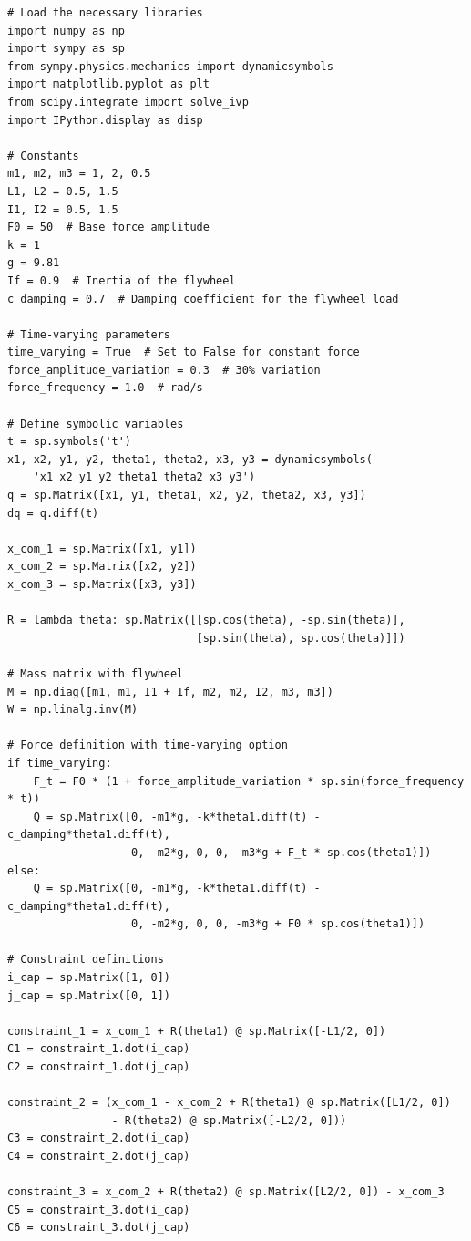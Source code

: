 \documentclass[10pt]{article}
\begin{document}
\begin{verbatim}
# Load the necessary libraries
import numpy as np
import sympy as sp
from sympy.physics.mechanics import dynamicsymbols
import matplotlib.pyplot as plt
from scipy.integrate import solve_ivp
import IPython.display as disp

# Constants
m1, m2, m3 = 1, 2, 0.5
L1, L2 = 0.5, 1.5
I1, I2 = 0.5, 1.5
F0 = 50  # Base force amplitude
k = 1
g = 9.81
If = 0.9  # Inertia of the flywheel
c_damping = 0.7  # Damping coefficient for the flywheel load

# Time-varying parameters
time_varying = True  # Set to False for constant force
force_amplitude_variation = 0.3  # 30% variation
force_frequency = 1.0  # rad/s

# Define symbolic variables
t = sp.symbols('t')
x1, x2, y1, y2, theta1, theta2, x3, y3 = dynamicsymbols(
    'x1 x2 y1 y2 theta1 theta2 x3 y3')
q = sp.Matrix([x1, y1, theta1, x2, y2, theta2, x3, y3])
dq = q.diff(t)

x_com_1 = sp.Matrix([x1, y1])
x_com_2 = sp.Matrix([x2, y2])
x_com_3 = sp.Matrix([x3, y3])

R = lambda theta: sp.Matrix([[sp.cos(theta), -sp.sin(theta)], 
                             [sp.sin(theta), sp.cos(theta)]])

# Mass matrix with flywheel
M = np.diag([m1, m1, I1 + If, m2, m2, I2, m3, m3])
W = np.linalg.inv(M)

# Force definition with time-varying option
if time_varying:
    F_t = F0 * (1 + force_amplitude_variation * sp.sin(force_frequency * t))
    Q = sp.Matrix([0, -m1*g, -k*theta1.diff(t) - c_damping*theta1.diff(t), 
                   0, -m2*g, 0, 0, -m3*g + F_t * sp.cos(theta1)])
else:
    Q = sp.Matrix([0, -m1*g, -k*theta1.diff(t) - c_damping*theta1.diff(t), 
                   0, -m2*g, 0, 0, -m3*g + F0 * sp.cos(theta1)])

# Constraint definitions
i_cap = sp.Matrix([1, 0])
j_cap = sp.Matrix([0, 1])

constraint_1 = x_com_1 + R(theta1) @ sp.Matrix([-L1/2, 0])
C1 = constraint_1.dot(i_cap)
C2 = constraint_1.dot(j_cap)

constraint_2 = (x_com_1 - x_com_2 + R(theta1) @ sp.Matrix([L1/2, 0]) 
                - R(theta2) @ sp.Matrix([-L2/2, 0]))
C3 = constraint_2.dot(i_cap)
C4 = constraint_2.dot(j_cap)

constraint_3 = x_com_2 + R(theta2) @ sp.Matrix([L2/2, 0]) - x_com_3
C5 = constraint_3.dot(i_cap)
C6 = constraint_3.dot(j_cap)


\end{verbatim}
\end{document}

